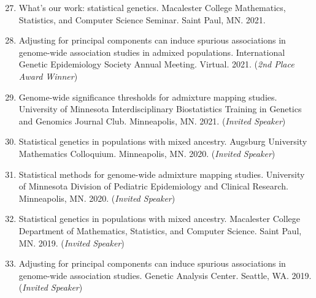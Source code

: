 \documentclass[margin]{res}
\newenvironment{benumerate}[1]{
    \let\oldItem\item
    \def\item{\addtocounter{enumi}{-2}\oldItem}
    
    \begin{enumerate}
    \setcounter{enumi}{#1}
    \addtocounter{enumi}{1}
}{
    \end{enumerate}
}
\begin{document}
\begin{resume}
\begin{benumerate}{26} %


\item What's our work: statistical genetics. Macalester College Mathematics, Statistics, and Computer Science Seminar. Saint Paul, MN. 2021.

\item Adjusting for principal components can induce spurious associations in genome-wide association studies in admixed populations. International Genetic Epidemiology Society Annual Meeting. Virtual. 2021. (\textit{2nd Place Award Winner})

\item Genome-wide significance thresholds for admixture mapping studies. University of Minnesota Interdisciplinary Biostatistics Training in Genetics and Genomics Journal Club. Minneapolis, MN. 2021. (\textit{Invited Speaker})

\item Statistical genetics in populations with mixed ancestry. Augsburg University Mathematics Colloquium. Minneapolis, MN. 2020. (\textit{Invited Speaker})

\item Statistical methods for genome-wide admixture mapping studies. University of Minnesota Division of Pediatric Epidemiology and Clinical Research. Minneapolis, MN. 2020. (\textit{Invited Speaker})

\item Statistical genetics in populations with mixed ancestry. Macalester College Department of Mathematics, Statistics, and Computer Science. Saint Paul, MN. 2019. (\textit{Invited Speaker})


\item Adjusting for principal components can induce spurious associations in genome-wide association studies. Genetic Analysis Center. Seattle, WA. 2019. (\textit{Invited Speaker})


\end{benumerate}
\end{resume}
\end{document}
